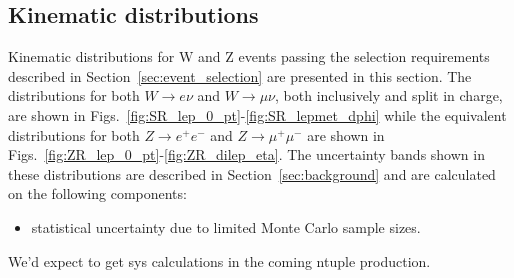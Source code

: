 
\subsection{Kinematic distributions}
\label{sec:kinematic_distributions}

Kinematic distributions for W and Z events passing the selection requirements described in Section~\ref{sec:event_selection} are presented in this section. 
The distributions for both $W \rightarrow e\nu$ and $W \rightarrow \mu\nu$, both inclusively and split in
charge, are shown in Figs.~\ref{fig:SR_lep_0_pt}-\ref{fig:SR_lepmet_dphi} while the equivalent distributions for both $Z \rightarrow e^+ e^-$ and $Z \rightarrow \mu^+ \mu^-$  are shown in Figs.~\ref{fig:ZR_lep_0_pt}-\ref{fig:ZR_dilep_eta}. 
The uncertainty bands shown in these distributions are described in Section~\ref{sec:background} and are calculated on the following components:
\begin{itemize}
\item statistical uncertainty due to limited Monte Carlo sample sizes.
\end{itemize}

We'd expect to get sys calculations in the coming ntuple production.



